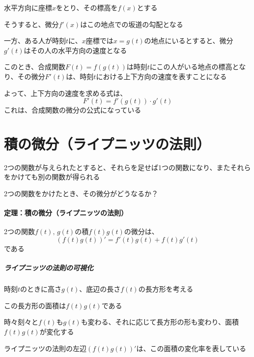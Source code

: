 \documentclass[../book_jiriki_calc]{subfiles}
\begin{document}
\br

水平方向に座標$x$をとり、その標高を$f(x)$とする

そうすると、微分$f'(x)$はこの地点での坂道の勾配となる

\br

一方、ある人が時刻$t$に、$x$座標では$x=g(t)$の地点にいるとすると、微分$g'(t)$はその人の水平方向の速度となる

\br

このとき、合成関数$F(t) = f(g(t))$は時刻$t$にこの人がいる地点の標高となり、その微分$F'(t)$は、時刻$t$における上下方向の速度を表すことになる

\br

よって、上下方向の速度を求める式は、
\begin{equation}
  F'(t) = f'(g(t)) \cdot g'(t)
\end{equation}
これは、合成関数の微分の公式になっている

\section{積の微分（ライプニッツの法則）}

2つの関数が与えられたとすると、それらを足せば1つの関数になり、またそれらをかけても別の関数が得られる

2つの関数をかけたとき、その微分がどうなるか？

\sectionline

\paragraph{定理：積の微分（ライプニッツの法則）}\quad

2つの関数$f(t),\, g(t)$の積$f(t)g(t)$の微分は、
\begin{equation}
  (f(t)g(t))' = f'(t)g(t) + f(t)g'(t)
\end{equation}
である

\sectionline

\subparagraph{ライプニッツの法則の可視化}\quad

時刻$t$のときに高さ$g(t)$、底辺の長さ$f(t)$の長方形を考える

この長方形の面積は$f(t)g(t)$である

\br

時々刻々と$f(t)$も$g(t)$も変わる、それに応じて長方形の形も変わり、面積$f(t)g(t)$が変化する

ライプニッツの法則の左辺$(f(t)g(t))'$は、この面積の変化率を表している

\br
\end{document}
